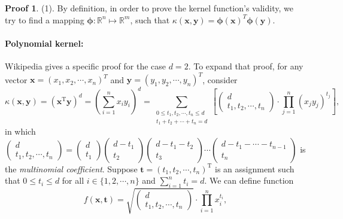 \documentclass[a4paper,UTF8]{article}
\numberwithin{equation}{section}
\theoremstyle{definition}
\newtheorem*{prove}{Proof}
\begin{document}
\begin{prove}
\item{(1).} By definition, in order to prove the kernel function's validity, we try to find a mapping $\bm{\phi}: \mathbb{R}^n\mapsto \mathbb{R}^m$, such that $\kappa(\bm{x}, \bm{y})=\bm{\phi}(\bm{x})^T\bm{\phi}(\bm{y})$. 

\paragraph{Polynomial kernel: } Wikipedia\cite{ref: wiki_poly_kernel} gives a specific proof for the case $d=2$. To expand that proof, for any vector $\bm{x}=(x_1,x_2,\cdots, x_n)^T$ and $\bm{y}=(y_1,y_2,\cdots, y_n)^T$, consider
\begin{equation}\label{multiexpand}
\kappa(\bm{x},\bm{y})=(\bm{x}^\mathrm{T}\bm{y})^d=(\sum_{i=1}^nx_iy_i)^d=\sum_{\substack{0\leq t_1,t_2,\cdots,t_n\leq d \\ t_1+t_2+\cdots+t_n=d}}\left[\begin{pmatrix}d\\t_1,t_2,\cdots,t_n\end{pmatrix}\cdot\prod_{j=1}^n(x_jy_j)^{t_j}\right],
\end{equation}
in which $\begin{pmatrix}d\\t_1,t_2,\cdots,t_n\end{pmatrix}=\begin{pmatrix}d\\t_1\end{pmatrix}\begin{pmatrix}d-t_1\\t_2\end{pmatrix}\begin{pmatrix}d-t_1-t_2\\t_3\end{pmatrix}\cdots\begin{pmatrix}d-t_1-\cdots-t_{n-1}\\t_n\end{pmatrix}$ is the \textit{multinomial coefficient}. Suppose $\bm{t}=(t_1,t_2,\cdots,t_n)^\mathrm{T}$ is an assignment such that $0\leq t_i\leq d$ for all $i\in\{1,2,\cdots,n\}$ and $\sum_{i=1}^n t_i=d$. We can define function
\begin{equation}
f(\bm{x}, \bm{t})=\sqrt{\begin{pmatrix}d\\t_1,t_2,\cdots,t_n\end{pmatrix}}\cdot\prod_{i=1}^n x_i^{t_i},

\end{equation}
\end{prove}
\end{document}
